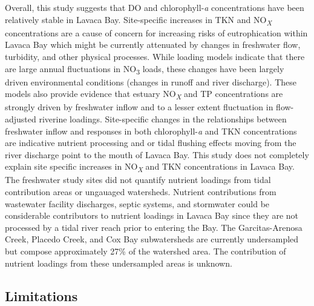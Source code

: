 \documentclass[fleqn,10pt,lineno]{wlpeerj} %
\begin{document}
Overall, this study suggests that DO and chlorophyll-\emph{a}
concentrations have been relatively stable in Lavaca Bay. Site-specific
increases in TKN and NO\textsubscript{\emph{X}} concentrations are a
cause of concern for increasing risks of eutrophication within Lavaca
Bay which might be currently attenuated by changes in freshwater flow,
turbidity, and other physical processes. While loading models indicate
that there are large annual fluctuations in NO\textsubscript{3} loads,
these changes have been largely driven environmental conditions (changes
in runoff and river discharge). These models also provide evidence that
estuary NO\textsubscript{\emph{X}} and TP concentrations are strongly
driven by freshwater inflow and to a lesser extent fluctuation in
flow-adjusted riverine loadings. Site-specific changes in the
relationships between freshwater inflow and responses in both
chlorophyll-\emph{a} and TKN concentrations are indicative nutrient
processing and or tidal flushing effects moving from the river discharge
point to the mouth of Lavaca Bay. This study does not completely explain
site specific increases in NO\textsubscript{\emph{X}} and TKN
concentrations in Lavaca Bay. The freshwater study sites did not
quantify nutrient loadings from tidal contribution areas or ungauaged
watersheds. Nutrient contributions from wastewater facility discharges,
septic systems, and stormwater could be considerable contributors to
nutrient loadings in Lavaca Bay since they are not processed by a tidal
river reach prior to entering the Bay. The Garcitas-Arenosa Creek,
Placedo Creek, and Cox Bay subwatersheds are currently undersampled but
compose approximately 27\% of the watershed area. The contribution of
nutrient loadings from these undersampled areas is unknown.

\hypertarget{limitations}{%
\subsection*{Limitations}\label{limitations}}
\end{document}
